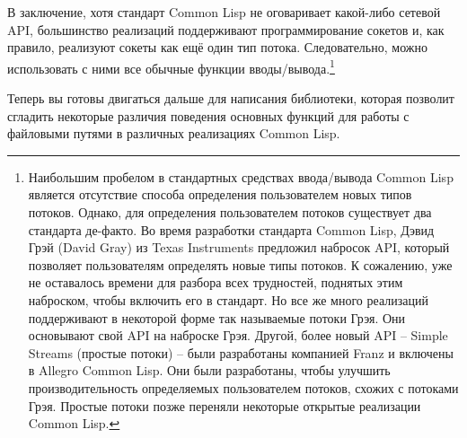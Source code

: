 В заключение, хотя стандарт Common Lisp не оговаривает какой-либо сетевой API, большинство
реализаций поддерживают программирование сокетов и, как правило, реализуют сокеты как ещё
один тип потока. Следовательно, можно использовать с ними все обычные функции
вводы/вывода.\footnote{Наибольшим пробелом в стандартных средствах ввода/вывода Common
  Lisp является отсутствие способа определения пользователем новых типов потоков. Однако,
  для определения пользователем потоков существует два стандарта де-факто. Во время
  разработки стандарта Common Lisp, Дэвид Грэй (David Gray) из Texas Instruments предложил
  набросок API, который позволяет пользователям определять новые типы потоков. К
  сожалению, уже не оставалось времени для разбора всех трудностей, поднятых этим
  наброском, чтобы включить его в стандарт. Но все же много реализаций поддерживают в
  некоторой форме так называемые потоки Грэя. Они основывают свой API на наброске
  Грэя. Другой, более новый API -- Simple Streams (простые потоки) -- были разработаны
  компанией Franz и включены в Allegro Common Lisp. Они были разработаны, чтобы улучшить
  производительность определяемых пользователем потоков, схожих с потоками Грэя. Простые
  потоки позже переняли некоторые открытые реализации Common Lisp.}

Теперь вы готовы двигаться дальше для написания библиотеки, которая позволит сгладить
некоторые различия поведения основных функций для работы с файловыми путями в различных
реализациях Common Lisp.

